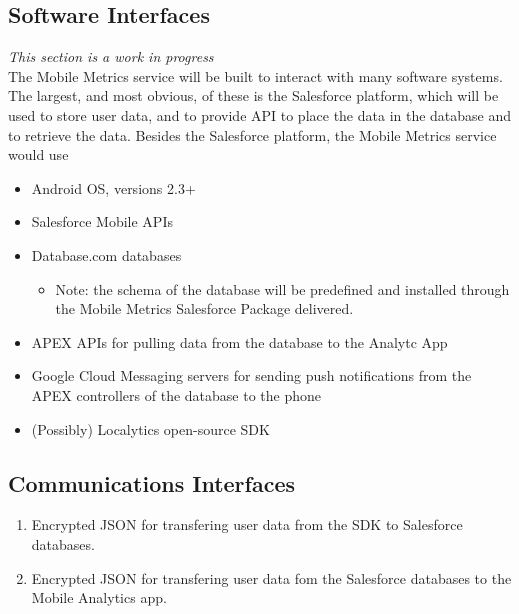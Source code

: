 \documentclass[12pt,oneside,letterpaper]{article}
\begin{document}
\subsection{Software Interfaces}
\emph{This section is a work in progress}\\
The Mobile Metrics service will be built to interact with many software systems. The largest, and most obvious, of these is the Salesforce platform, which will be used to store user data, and to provide API to place the data in the database and to retrieve the data. Besides the Salesforce platform, the Mobile Metrics service would use
\begin{itemize}
\item Android OS, versions 2.3+
\item Salesforce Mobile APIs
\item Database.com databases
\begin{itemize}
\item Note: the schema of the database will be predefined and installed through the Mobile Metrics Salesforce Package delivered.
\end{itemize}
\item APEX APIs for pulling data from the database to the Analytc App
\item Google Cloud Messaging servers for sending push notifications from the APEX controllers of the database to the phone
\item (Possibly) Localytics open-source SDK
\end{itemize}
\subsection{Communications Interfaces}
\begin{enumerate}
\item Encrypted JSON for transfering user data from the SDK to Salesforce databases.
\item Encrypted JSON for transfering user data fom the Salesforce databases to the Mobile Analytics app.
\end{enumerate}
\end{document}
